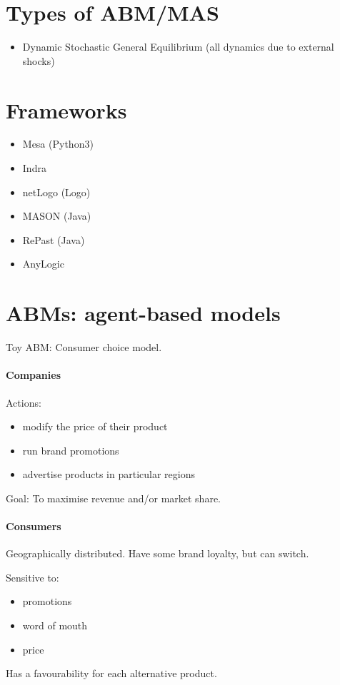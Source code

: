 \documentclass{article}
\begin{document}
\section{Types of ABM/MAS}
\begin{itemize}
    \item Dynamic Stochastic General Equilibrium (all dynamics due to external shocks)
\end{itemize}

\section{Frameworks}

\begin{itemize}
    \item Mesa (Python3)
    \item Indra
    \item netLogo (Logo)
    \item MASON (Java)
    \item RePast (Java)
    \item AnyLogic
\end{itemize}

\section{ABMs: agent-based models}

Toy ABM: Consumer choice model.

\paragraph{Companies}

Actions: 
\begin{itemize}
    \item modify the price of their product
    \item run brand promotions
    \item advertise products in particular regions
\end{itemize}

Goal: To maximise revenue and/or market share.

\paragraph{Consumers}
Geographically distributed. Have some brand loyalty, but can switch.

Sensitive to:
\begin{itemize}
    \item promotions
    \item word of mouth
    \item price
\end{itemize}

Has a favourability for each alternative product.
\end{document}
